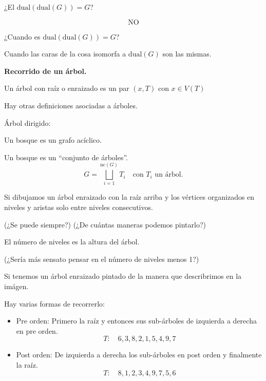 \documentclass[../main.tex]{subfiles}
\begin{document}
\begin{figure}[H]
	\bfseries
	\boldmath
	\centering
	
\end{figure}

\conjetura

¿El $\text{dual$(\text{dual$(G)$})=G$}$?

\[
	\text{NO}
\]

¿Cuando es $\text{dual$(\text{dual$(G)$})=G$}$?

Cuando las caras de la cosa isomorfa a  $\text{dual$(G)$}$ son las mismas.

\textbf{Recorrido de un árbol.}

Un árbol con raíz o enraizado es un par $(x,T)$ con $x\in V(T)$

\ejemplo

\begin{figure}[H]
	\centering
	
\end{figure}

Hay otras definiciones asociadas a árboles.

Árbol dirigido:

\begin{figure}[H]
	\centering
	
\end{figure}

Un bosque es un grafo acíclico.

\teorema
Un bosque es un ``conjunto de árboles''.
\[
	G=\bigsqcup_{i=1}^{\text{nc}(G)} T_i \quad \text{con $T_i$ un árbol.}
\]

Si dibujamos un árbol enraizado con la raíz arriba y los vértices organizados
en niveles y aristas solo entre niveles consecutivos.

(¿Se puede siempre?)
(¿De cuántas maneras podemos pintarlo?)

El número de niveles es la altura del árbol.

(¿Sería más sensato pensar en el número de niveles menos 1?)

\begin{figure}[H]
	\centering
	
\end{figure}

Si tenemos un árbol enraizado pintado de la manera que describrimos en la
imágen.

Hay varias formas de recorrerlo:
\begin{itemize}
	\item Pre orden:
		\subitem Primero la raíz y entonces sus sub-árboles de izquierda
			a derecha en pre orden.
			\[
				T:\quad 6,3,8,2,1,5,4,9,7
			\]
	\item Post orden:
		\subitem De izquierda a derecha los sub-árboles en post orden y
			finalmente la raíz.
			\[
				T:\quad 8,1,2,3,4,9,7,5,6
			\]
\end{itemize}
\end{document}
